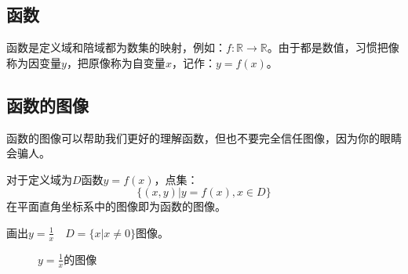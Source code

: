 \subsection{函数}
\begin{definition}[函数]
    函数是定义域和陪域都为数集的映射，例如：$f:\mathbb{R}\to \mathbb{R}$。由于都是数值，习惯把像称为因变量$y$，把原像称为自变量$x$，记作：$y=f(x)$。
\end{definition}
\subsection{函数的图像}
函数的图像可以帮助我们更好的理解函数，但也不要完全信任图像，因为你的眼睛会骗人。
\begin{definition}[函数图像]
    对于定义域为$D$函数$y=f(x)$，点集：$$\{(x,y)|y=f(x),x\in D\}$$在平面直角坐标系中的图像即为函数的图像。
\end{definition}
\begin{exercise}[反比例函数的图像]
    画出$y=\frac{1}{x} \quad D = \{x|x\ne 0\}$图像。
\end{exercise}
\begin{solution}
    \begin{figure}[H]
        \centering
        \caption{$y=\frac{1}{x}$的图像}
    \end{figure}
\end{solution}
